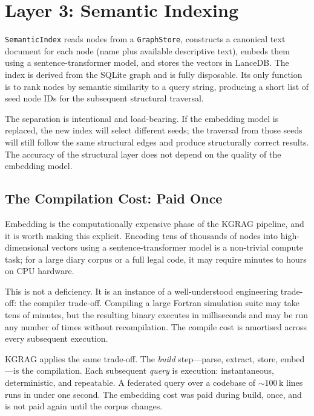 \documentclass[10pt]{article}
\begin{document}
\section{Layer 3: Semantic Indexing}

\texttt{SemanticIndex} reads nodes from a \texttt{GraphStore}, constructs a
canonical text document for each node (name plus available descriptive text),
embeds them using a sentence-transformer model, and stores the vectors in
LanceDB. The index is derived from the SQLite graph and is fully disposable.
Its only function is to rank nodes by semantic similarity to a query string,
producing a short list of seed node IDs for the subsequent structural traversal.

The separation is intentional and load-bearing. If the embedding model is
replaced, the new index will select different seeds; the traversal from those
seeds will still follow the same structural edges and produce structurally
correct results. The accuracy of the structural layer does not depend on the
quality of the embedding model.

\subsection{The Compilation Cost: Paid Once}

Embedding is the computationally expensive phase of the KGRAG pipeline, and it
is worth making this explicit. Encoding tens of thousands of nodes into
high-dimensional vectors using a sentence-transformer model is a non-trivial
compute task; for a large diary corpus or a full legal code, it may require
minutes to hours on CPU hardware.

This is not a deficiency. It is an instance of a well-understood engineering
trade-off: the compiler trade-off. Compiling a large Fortran simulation suite
may take tens of minutes, but the resulting binary executes in milliseconds and
may be run any number of times without recompilation. The compile cost is
amortised across every subsequent execution.

KGRAG applies the same trade-off. The \emph{build} step---parse, extract,
store, embed---is the compilation. Each subsequent \emph{query} is execution:
instantaneous, deterministic, and repeatable. A federated query over a
codebase of $\sim$100\,k lines runs in under one second. The embedding cost
was paid during build, once, and is not paid again until the corpus changes.
\end{document}
